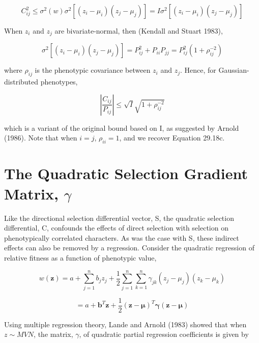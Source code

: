 \documentclass{article}
\begin{document}
\begin{equation}
C_{i j}^{2}\leq\sigma^{2}(w)\sigma^{2}[(z_{i}-\mu_{i})(z_{j}-\mu_{j})]=I\sigma^{2}[(z_{i}-\mu_{i})(z_{j}-\mu_{j})]
\tag{30.9a}
\label{eq:30_9a}
\end{equation}

When  $ z_{i} $ and  $ z_{j} $ are bivariate-normal, then (Kendall and Stuart 1983),

\begin{equation}
\sigma^{2}[(z_{i}-\mu_{i})(z_{j}-\mu_{j})]=P_{i j}^{2}+P_{i i}P_{j j}=P_{i j}^{2}(1+\rho_{i j}^{-2})
\tag{30.9b}
\label{eq:30_9b}
\end{equation}

where  $ \rho_{ij} $ is the phenotypic covariance between  $ z_{i} $ and  $ z_{j} $. Hence, for Gaussian-distributed phenotypes,

\begin{equation}
\left|\frac{C_{ij}}{P_{ij}}\right|\leq\sqrt{I}\sqrt{1+\rho_{ij}^{-2}}
\tag{30.10}
\label{eq:30_10}
\end{equation}

which is a variant of the original bound based on I, as suggested by Arnold (1986). Note that when  $ i = j $,  $ \rho_{ii} = 1 $, and we recover Equation 29.18c.

\section{The Quadratic Selection Gradient Matrix,  $ \gamma $}
Like the directional selection differential vector, S, the quadratic selection differential, C, confounds the effects of direct selection with selection on phenotypically correlated characters. As was the case with S, these indirect effects can also be removed by a regression. Consider the quadratic regression of relative fitness as a function of phenotypic value,

\begin{equation}
w(\mathbf{z})=a+\sum_{j=1}^{n}b_{j}z_{j}+\frac{1}{2}\sum_{j=1}^{n}\sum_{k=1}^{n}\gamma_{jk}\left(z_{j}-\mu_{j}\right)(z_{k}-\mu_{k})
\tag{30.11a}
\label{eq:30_11a}
\end{equation}

\begin{equation}
=a+\mathbf{b}^{T}\mathbf{z}+\frac{1}{2}(\mathbf{z}-\boldsymbol{\mu})^{T}\boldsymbol{\gamma}(\mathbf{z}-\boldsymbol{\mu})
\tag{30.11b}
\label{eq:30_11b}
\end{equation}

Using multiple regression theory, Lande and Arnold (1983) showed that when  $ z \sim MVN $, the matrix,  $ \gamma $, of quadratic partial regression coefficients is given by
\end{document}
